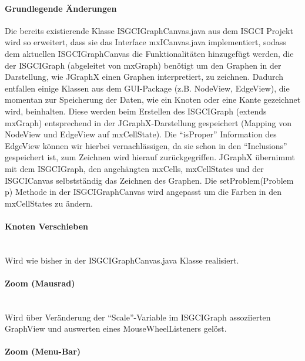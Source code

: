 \documentclass[10pt,a4paper]{article}
\begin{document}
\begin{itemize}
\paragraph{Grundlegende Änderungen}
Die bereits existierende Klasse ISGCIGraphCanvas.java aus dem ISGCI Projekt wird so erweitert, dass sie das Interface mxICanvas.java implementiert, sodass dem aktuellen ISGCIGraphCanvas die Funktionalitäten hinzugefügt werden, die der ISGCIGraph (abgeleitet von mxGraph) benötigt um den Graphen in der Darstellung, wie JGraphX einen Graphen interpretiert, zu zeichnen. 
Dadurch entfallen einige Klassen aus dem GUI-Package (z.B. NodeView, EdgeView), die momentan zur Speicherung der Daten, wie ein Knoten oder eine Kante gezeichnet wird, beinhalten. Diese werden beim Erstellen des ISGCIGraph (extends mxGraph) entsprechend in der JGraphX-Darstellung gespeichert (Mapping von NodeView und EdgeView auf mxCellState). Die "`isProper"' Information des EdgeView können wir hierbei vernachlässigen, da sie schon in den "`Inclusions"' gespeichert ist, zum Zeichnen wird hierauf zurückgegriffen. 
JGraphX übernimmt mit dem ISGCIGraph, den angehängten mxCells, mxCellStates und der ISGCICanvas selbstständig das Zeichnen des Graphen.
Die setProblem(Problem p) Methode in der ISGCIGraphCanvas wird angepasst um die Farben in den mxCellStates zu ändern.

\paragraph{Knoten Verschieben}\ \\ 

Wird wie bisher in der ISGCIGraphCanvas.java Klasse realisiert.

\paragraph{Zoom (Mausrad)}\ \\ 

Wird über Veränderung der "`Scale"'-Variable im ISGCIGraph assoziierten GraphView und auswerten eines MouseWheelListeners gelöst.

\paragraph{Zoom (Menu-Bar)}\ \\ 


\end{itemize}
\end{document}
